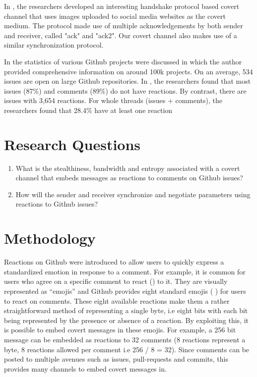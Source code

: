 \documentclass[conference]{IEEEtran}
\begin{document}
In \cite{b6}, the researchers developed an interesting handshake protocol based covert channel that uses images uploaded to social media websites as the covert medium. The protocol made use of multiple acknowledgements by both sender and receiver, called "ack" and "ack2". Our covert channel also makes use of a similar synchronization protocol.

In \cite{b7} the statistics of various Github projects were discussed in which the author provided comprehensive information on around 100k projects. On an average, 534 issues are open on large Github repositories. In \cite{b8}, the researchers found that most issues (87\%) and comments (89\%) do not have reactions. By contrast, there are issues with 3,654 reactions. For whole threads (issues + comments), the researchers found that 28.4\% have at least one reaction

\section{Research Questions}
\begin{enumerate}
\item What is the stealthiness, bandwidth and entropy associated with a covert channel that embeds messages as reactions to comments on Github issues?
\item How will the sender and receiver synchronize and negotiate parameters using reactions to Github issues?
\end{enumerate}

\section{Methodology}
Reactions on Github were introduced to allow users to quickly express a standardized emotion in response to a comment. For example, it is common for users who agree on a specific comment to react () to it. They are visually represented as “emojis” and Github provides eight standard emojis (       ) for users to react on comments. These eight available reactions make them a rather straightforward method of representing a single byte, i.e eight bits with each bit being represented by the presence or absence of a reaction. By exploiting this, it is possible to embed covert messages in these emojis. For example, a 256 bit message can be embedded as reactions to 32 comments (8 reactions represent a byte, 8 reactions allowed per comment i.e 256 / 8 = 32). Since comments can be posted to multiple avenues such as issues, pull-requests and commits, this provides many channels to embed covert messages in. 
\end{document}
